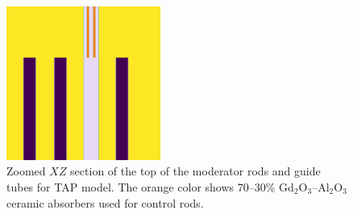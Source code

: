 \documentclass[12pt]{article} %
\begin{document}
\begin{figure}[htp!] %
  \centering
		  \includegraphics[width=0.45\textwidth]{tap_elev_view_zoomed.png}
  \caption{Zoomed $XZ$ section of the top of the moderator rods and guide tubes for \gls{TAP} model. The orange color shows 70–30\% Gd$_2$O$_3$–Al$_2$O$_3$ ceramic 
absorbers used for control rods.}
  \label{fig:tap-serpent-elev-zoom}
\end{figure}
\end{document}
